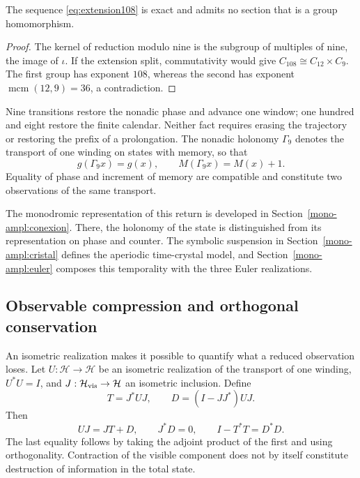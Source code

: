 \begin{proposition}
The sequence \eqref{eq:extension108} is exact and admits no section that is a group homomorphism.
\end{proposition}
\begin{proof}
The kernel of reduction modulo nine is the subgroup of multiples of nine, the image of \(\iota\). If the extension split, commutativity would give \(C_{108}\cong C_{12}\times C_9\). The first group has exponent \(108\), whereas the second has exponent \(\operatorname{mcm}(12,9)=36\), a contradiction.
\end{proof}

Nine transitions restore the nonadic phase and advance one window; one hundred and eight restore the finite calendar. Neither fact requires erasing the trajectory or restoring the prefix of a prolongation. The nonadic holonomy \(\Gamma_9\) denotes the transport of one winding on states with memory, so that
\begin{equation}
 g(\Gamma_9x)=g(x),\qquad M(\Gamma_9x)=M(x)+1.
 \label{eq:holonomia-memoria}
\end{equation}
Equality of phase and increment of memory are compatible and constitute two observations of the same transport.



The monodromic representation of this return is developed in
Section~\ref{mono-ampl:conexion}. There, the holonomy of the
state is distinguished from its representation on phase and counter. The symbolic
suspension in Section~\ref{mono-ampl:cristal} defines the aperiodic
time-crystal model, and Section~\ref{mono-ampl:euler}
composes this temporality with the three Euler realizations.

\subsection{Observable compression and orthogonal conservation}

An isometric realization makes it possible to quantify what a reduced observation loses. Let \(U:\mathcal H\to\mathcal H\) be an isometric realization of the transport of one winding, \(U^*U=I\), and \(J:\mathcal H_{\rm vis}\to\mathcal H\) an isometric inclusion. Define
\[
 T=J^*UJ,\qquad D=(I-JJ^*)UJ.
\]
Then
\begin{equation}
 UJ=JT+D,\qquad J^*D=0,\qquad I-T^*T=D^*D.
 \label{eq:conservacion-ortogonal}
\end{equation}
The last equality follows by taking the adjoint product of the first and using orthogonality. Contraction of the visible component does not by itself constitute destruction of information in the total state.


